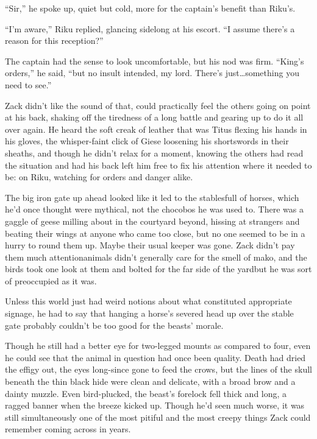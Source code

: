 ``Sir,'' he spoke up, quiet but cold, more for the captain's benefit than Riku's.

``I'm aware,'' Riku replied, glancing sidelong at his escort. ``I assume there's a reason for this reception?''

The captain had the sense to look uncomfortable, but his nod was firm. ``King's orders,'' he said, ``but no insult intended, my lord. There's just\ldots something you need to see.''

Zack didn't like the sound of that, could practically feel the others going on point at his back, shaking off the tiredness of a long battle and gearing up to do it all over again. He heard the soft creak of leather that was Titus flexing his hands in his gloves, the whisper-faint click of Giese loosening his shortswords in their sheaths, and though he didn't relax for a moment, knowing the others had read the situation and had his back left him free to fix his attention where it needed to be: on Riku, watching for orders and danger alike.

The big iron gate up ahead looked like it led to the stables\textemdash full of horses, which he'd once thought were mythical, not the chocobos he was used to. There was a gaggle of geese milling about in the courtyard beyond, hissing at strangers and beating their wings at anyone who came too close, but no one seemed to be in a hurry to round them up. Maybe their usual keeper was gone. Zack didn't pay them much attention\textemdash animals didn't generally care for the smell of mako, and the birds took one look at them and bolted for the far side of the yard\textemdash but he was sort of preoccupied as it was.

Unless this world just had weird notions about what constituted appropriate signage, he had to say that hanging a horse's severed head up over the stable gate probably couldn't be too good for the beasts' morale.

Though he still had a better eye for two-legged mounts as compared to four, even he could see that the animal in question had once been quality. Death had dried the effigy out, the eyes long-since gone to feed the crows, but the lines of the skull beneath the thin black hide were clean and delicate, with a broad brow and a dainty muzzle. Even bird-plucked, the beast's forelock fell thick and long, a ragged banner when the breeze kicked up. Though he'd seen much worse, it was still simultaneously one of the most pitiful and the most creepy things Zack could remember coming across in years.

